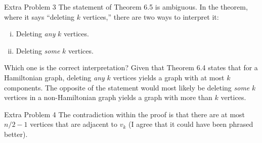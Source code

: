 \documentclass[9pt]{extarticle}
\begin{document}
  \begin{problem}{Extra Problem 3}
    The statement of Theorem 6.5 is ambiguous. In the theorem, where it says ``deleting $k$ vertices,'' there are two ways to interpret it:
    \begin{enumerate}[(i)]
      \item Deleting \textit{any} $k$ vertices.
      \item Deleting \textit{some} $k$ vertices.
    \end{enumerate}
    Which one is the correct interpretation?
    \tcblower
    Given that Theorem 6.4 states that for a Hamiltonian graph, deleting \textit{any} $k$ vertices yields a graph with at most $k$ components. The opposite of the statement would most likely be deleting \textit{some} $k$ vertices in a non-Hamiltonian graph yields a graph with more than $k$ vertices.
  \end{problem}
  \begin{problem}{Extra Problem 4}
    The contradiction within the proof is that there are at most $n/2-1$ vertices that are adjacent to $v_k$ (I agree that it could have been phrased better).
  \end{problem}
\end{document}
